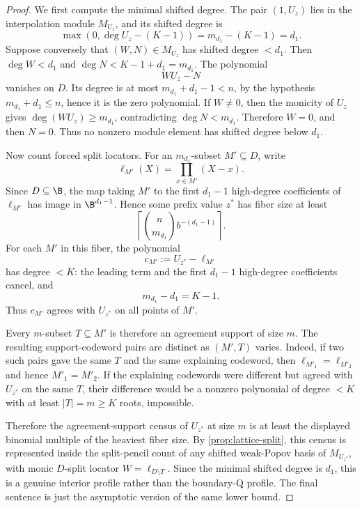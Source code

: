 \begin{proof}
We first compute the minimal shifted degree.  The pair \((1,U_z)\) lies in
the interpolation module \(M_{U_z}\), and its shifted degree is
\[
        \max(0,\deg U_z-(K-1))=m_{d_1}-(K-1)=d_1 .
\]
Suppose conversely that \((W,N)\in M_{U_z}\) has shifted degree \(<d_1\).
Then \(\deg W<d_1\) and \(\deg N<K-1+d_1=m_{d_1}\).  The polynomial
\[
        WU_z-N
\]
vanishes on \(D\).  Its degree is at most \(m_{d_1}+d_1-1<n\), by the
hypothesis \(m_{d_1}+d_1\le n\), hence it is the zero polynomial.  If
\(W\ne0\), then the monicity of \(U_z\) gives
\(\deg(WU_z)\ge m_{d_1}\), contradicting \(\deg N<m_{d_1}\).  Therefore
\(W=0\), and then \(N=0\).  Thus no nonzero module element has shifted degree
below \(d_1\).

Now count forced split locators.  For an \(m_{d_1}\)-subset
\(M'\subseteq D\), write
\[
        \ell_{M'}(X)=\prod_{x\in M'}(X-x).
\]
Since \(D\subseteq\B\), the map taking \(M'\) to the first \(d_1-1\)
high-degree coefficients of \(\ell_{M'}\) has image in
\(\B^{d_1-1}\).  Hence some prefix value \(z^*\) has fiber size at least
\[
        \left\lceil \binom n{m_{d_1}}b^{-(d_1-1)}\right\rceil .
\]
For each \(M'\) in this fiber, the polynomial
\[
        c_{M'}:=U_{z^*}-\ell_{M'}
\]
has degree \(<K\): the leading term and the first \(d_1-1\) high-degree
coefficients cancel, and
\[
        m_{d_1}-d_1=K-1 .
\]
Thus \(c_{M'}\) agrees with \(U_{z^*}\) on all points of \(M'\).

Every \(m\)-subset \(T\subseteq M'\) is therefore an agreement support of
size \(m\).  The resulting support-codeword pairs are distinct as
\((M',T)\) varies.  Indeed, if two such pairs gave the same \(T\) and the
same explaining codeword, then
\(\ell_{M'_1}=\ell_{M'_2}\) and hence \(M'_1=M'_2\).  If the explaining
codewords were different but agreed with \(U_{z^*}\) on the same \(T\), their
difference would be a nonzero polynomial of degree \(<K\) with at least
\(|T|=m\ge K\) roots, impossible.

Therefore the agreement-support census of \(U_{z^*}\) at size \(m\) is at
least the displayed binomial multiple of the heaviest fiber size.  By
\cref{prop:lattice-split}, this census is represented inside the split-pencil
count of any shifted weak-Popov basis of \(M_{U_{z^*}}\), with monic
\(D\)-split locator \(W=\ell_{D\setminus T}\).  Since the minimal shifted
degree is \(d_1\), this is a genuine interior profile rather than the
boundary-Q profile.  The final sentence is just the asymptotic version of the
same lower bound.
\end{proof}

